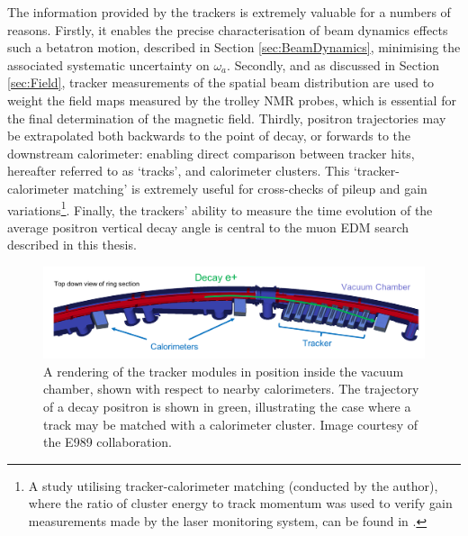 The information provided by the trackers is extremely valuable for a numbers of reasons. Firstly, it enables the precise characterisation of beam dynamics effects such a betatron motion, described in Section \ref{sec:BeamDynamics}, minimising the associated systematic uncertainty on $\omega_{a}$. Secondly, and as discussed in Section \ref{sec:Field}, tracker measurements of the spatial beam distribution are used to weight the field maps measured by the trolley NMR probes, which is essential for the final determination of the magnetic field. Thirdly, positron trajectories may be extrapolated both backwards to the point of decay, or forwards to the downstream calorimeter: enabling direct comparison between tracker hits, hereafter referred to as `tracks', and calorimeter clusters. This `tracker-calorimeter matching' is extremely useful for cross-checks of pileup and gain variations\footnote{A study utilising tracker-calorimeter matching (conducted by the author), where the ratio of cluster energy to track momentum was used to verify gain measurements made by the laser monitoring system, can be found in \cite{EpNote}.}. Finally, the trackers' ability to measure the time evolution of the average positron vertical decay angle is central to the muon EDM search described in this thesis.

\begin{figure}[t!]
\centering{}
\includegraphics[trim={0 0 0 0},clip,width=\textwidth]{Images/Chapter3/TrackerVacChamber.png}
\caption{A rendering of the tracker modules in position inside the vacuum chamber, shown with respect to nearby calorimeters. The trajectory of a decay positron is shown in green, illustrating the case where a track may be matched with a calorimeter cluster. Image courtesy of the E989 collaboration.}
\label{fig:TrackerSchematic}
\end{figure} 

